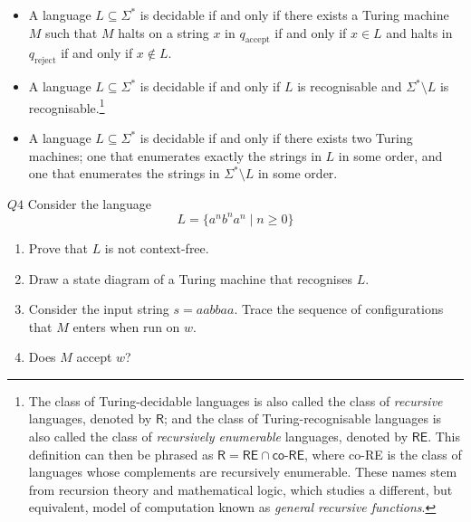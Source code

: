 \documentclass{article}
\theoremstyle{definition}
\theoremstyle{definition}
\theoremstyle{remark}
\begin{document}
\begin{itemize}
    \item A language $L\subseteq\Sigma^\ast$ is decidable if and only if there exists a Turing machine $M$ such that $M$ halts on a string $x$ in $q_\text{accept}$ if and only if $x\in L$ and halts in $q_\text{reject}$ if and only if $x\notin L$.

    \item A language $L\subseteq\Sigma^\ast$ is decidable if and only if $L$ is recognisable and $\Sigma^\ast\setminus L$ is recognisable.\footnote{The class of Turing-decidable languages is also called the class of \textit{recursive} languages, denoted by $\textsf{R}$; and the class of Turing-recognisable languages is also called the class of \textit{recursively enumerable} languages, denoted by $\textsf{RE}$. This definition can then be phrased as $\textsf{R}=\textsf{RE}\cap\textsf{co-RE}$, where \textsf{co-RE} is the class of languages whose complements are recursively enumerable. These names stem from recursion theory and mathematical logic, which studies a different, but equivalent, model of computation known as \textit{general recursive functions}.}
    
    \item A language $L\subseteq\Sigma^\ast$ is decidable if and only if there exists two Turing machines; one that enumerates exactly the strings in $L$ in some order, and one that enumerates the strings in $\Sigma^\ast\setminus L$ in some order.
\end{itemize}






\begin{questionbox}{$Q4$}
    Consider the language
    \begin{equation*}
        L=\{a^nb^na^n\mid n\geq0\}
    \end{equation*}
    \begin{enumerate}
        \item[$(i)$] Prove that $L$ is not context-free.
        
        \item[$(ii)$] Draw a state diagram of a Turing machine that recognises $L$.
    
        \item[$(iii)$] Consider the input string $s=aabbaa$. Trace the sequence of configurations that $M$ enters when run on $w$.
    
        \item[$(iv)$] Does $M$ accept $w$?
    \end{enumerate}
\end{questionbox}
\end{document}
